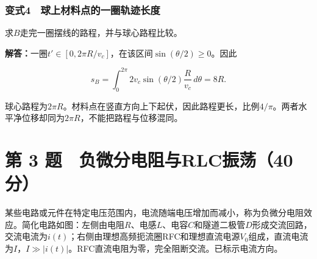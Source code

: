 \documentclass[12pt,a4paper,fontset=fandol]{ctexart}
\begin{document}
\par\noindent\begin{minipage}{\linewidth}
\subsubsection{变式4　球上材料点的一圈轨迹长度}\label{ux53d8ux5f0f4-ux7403ux4e0aux6750ux6599ux70b9ux7684ux4e00ux5708ux8f68ux8ff9ux957fux5ea6}

求\(B\)走完一圈摆线的路程，并与球心路程比较。

\textbf{解答：}一圈\(t'\in[0,2\pi R/v_c]\)，在该区间\(\sin(\theta/2)\geq0\)。因此

\[
s_B=\int_0^{2\pi}2v_c\sin(\theta/2)
\frac R{v_c}\,d\theta=8R.
\]

球心路程为\(2\pi R\)。材料点在竖直方向上下起伏，因此路程更长，比例\(4/\pi\)。两者水平净位移却同为\(2\pi R\)，不能把路程与位移混同。

\end{minipage}\par
\clearpage

\section{第 3
题　负微分电阻与RLC振荡（40分）}\label{ux7b2c-3-ux9898-ux8d1fux5faeux5206ux7535ux963bux4e0erlcux632fux836140ux5206}

某些电路或元件在特定电压范围内，电流随端电压增加而减小，称为负微分电阻效应。简化电路如图：左侧由电阻\(R\)、电感\(L\)、电容\(C\)和隧道二极管\(D\)形成交流回路，交流电流为\(i(t)\)；右侧由理想高频扼流圈RFC和理想直流电源\(V_0\)组成，直流电流为\(I\)，\(I\gg|i(t)|\)。RFC直流电阻为零，完全阻断交流。已标示电流方向。
\end{document}
